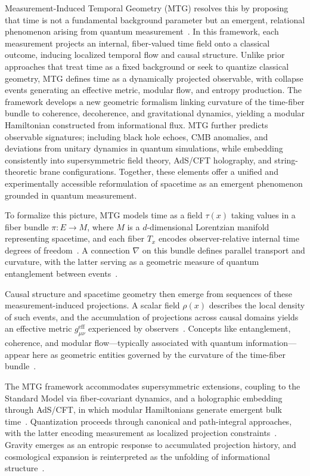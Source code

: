\documentclass[11pt]{article}
\begin{document}
Measurement-Induced Temporal Geometry (MTG) resolves this by proposing that time is not a fundamental background parameter but an emergent, relational phenomenon arising from quantum measurement~\cite{debianchi2024achronotopic, raasakka2025triangulated}. In this framework, each measurement projects an internal, fiber-valued time field onto a classical outcome, inducing localized temporal flow and causal structure. Unlike prior approaches that treat time as a fixed background or seek to quantize classical geometry, MTG defines time as a dynamically projected observable, with collapse events generating an effective metric, modular flow, and entropy production. The framework develops a new geometric formalism linking curvature of the time-fiber bundle to coherence, decoherence, and gravitational dynamics, yielding a modular Hamiltonian constructed from informational flux. MTG further predicts observable signatures; including black hole echoes, CMB anomalies, and deviations from unitary dynamics in quantum simulations, while embedding consistently into supersymmetric field theory, AdS/CFT holography, and string-theoretic brane configurations. Together, these elements offer a unified and experimentally accessible reformulation of spacetime as an emergent phenomenon grounded in quantum measurement.

To formalize this picture, MTG models time as a field \( \tau(x) \) taking values in a fiber bundle \( \pi: E \to M \), where \( M \) is a \( d \)-dimensional Lorentzian manifold representing spacetime, and each fiber \( T_x \) encodes observer-relative internal time degrees of freedom~\cite{kiefer2007time}. A connection \( \nabla \) on this bundle defines parallel transport and curvature, with the latter serving as a geometric measure of quantum entanglement between events~\cite{zhang2018entanglement}.

Causal structure and spacetime geometry then emerge from sequences of these measurement-induced projections. A scalar field \( \rho(x) \) describes the local density of such events, and the accumulation of projections across causal domains yields an effective metric \( g_{\mu\nu}^{\text{eff}} \) experienced by observers~\cite{chishtie2025spatialenergy}. Concepts like entanglement, coherence, and modular flow—typically associated with quantum information—appear here as geometric entities governed by the curvature of the time-fiber bundle~\cite{giacomini2019quantum, jemal2016modular, qi2018quantum}.

The MTG framework accommodates supersymmetric extensions, coupling to the Standard Model via fiber-covariant dynamics, and a holographic embedding through AdS/CFT, in which modular Hamiltonians generate emergent bulk time~\cite{jemal2016modular, maldacena1999ads}. Quantization proceeds through canonical and path-integral approaches, with the latter encoding measurement as localized projection constraints~\cite{tomaz2025rqd}. Gravity emerges as an entropic response to accumulated projection history, and cosmological expansion is reinterpreted as the unfolding of informational structure~\cite{chishtie2025spatialenergy, jacobson1995thermodynamics}.
\end{document}
